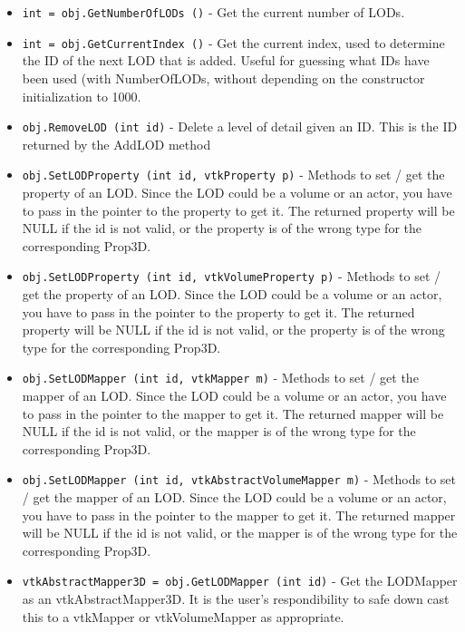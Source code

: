 \begin{itemize}
\item  \verb|int = obj.GetNumberOfLODs ()| -  Get the current number of LODs.

\item  \verb|int = obj.GetCurrentIndex ()| -  Get the current index, used to determine the ID of the next LOD that is
 added.  Useful for guessing what IDs have been used (with NumberOfLODs,
 without depending on the constructor initialization to 1000.

\item  \verb|obj.RemoveLOD (int id)| -  Delete a level of detail given an ID. This is the ID returned by the
 AddLOD method

\item  \verb|obj.SetLODProperty (int id, vtkProperty p)| -  Methods to set / get the property of an LOD. Since the LOD could be
 a volume or an actor, you have to pass in the pointer to the property
 to get it. The returned property will be NULL if the id is not valid,
 or the property is of the wrong type for the corresponding Prop3D.

\item  \verb|obj.SetLODProperty (int id, vtkVolumeProperty p)| -  Methods to set / get the property of an LOD. Since the LOD could be
 a volume or an actor, you have to pass in the pointer to the property
 to get it. The returned property will be NULL if the id is not valid,
 or the property is of the wrong type for the corresponding Prop3D.

\item  \verb|obj.SetLODMapper (int id, vtkMapper m)| -  Methods to set / get the mapper of an LOD. Since the LOD could be
 a volume or an actor, you have to pass in the pointer to the mapper
 to get it. The returned mapper will be NULL if the id is not valid,
 or the mapper is of the wrong type for the corresponding Prop3D.

\item  \verb|obj.SetLODMapper (int id, vtkAbstractVolumeMapper m)| -  Methods to set / get the mapper of an LOD. Since the LOD could be
 a volume or an actor, you have to pass in the pointer to the mapper
 to get it. The returned mapper will be NULL if the id is not valid,
 or the mapper is of the wrong type for the corresponding Prop3D.

\item  \verb|vtkAbstractMapper3D = obj.GetLODMapper (int id)| -  Get the LODMapper as an vtkAbstractMapper3D.  It is the user's
 respondibility to safe down cast this to a vtkMapper or vtkVolumeMapper
 as appropriate.


\end{itemize}
